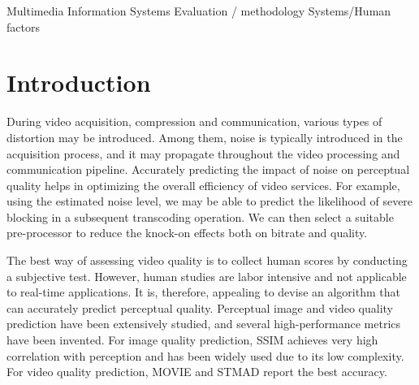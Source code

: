 \documentclass{sig-alternate}
\begin{document}
{Multimedia Information Systems Evaluation / methodology}
 {Systems/Human factors}


\section{Introduction}
During video acquisition, compression and communication, various types of distortion may be introduced. Among them, noise is typically introduced in the acquisition process, and it may propagate throughout the video processing and communication pipeline. Accurately predicting the impact of noise on perceptual quality helps in optimizing the overall efficiency of video services. For example, using the estimated noise level, we may be able to predict the likelihood of severe blocking in a subsequent transcoding operation\cite{AlMer1999}. We can then select a suitable pre-processor to reduce the knock-on effects both on bitrate and quality.

The best way of assessing video quality is to collect human scores by conducting a subjective test. However, human studies are labor intensive and not applicable to real-time applications. It is, therefore, appealing to devise an algorithm that can accurately predict perceptual quality. Perceptual image and video quality prediction have been extensively studied, and several high-performance metrics have been invented. For image quality prediction, SSIM\cite{SSIM} achieves very high correlation with perception and has been widely used due to its low complexity. For video quality prediction, MOVIE\cite{MOVIE} and STMAD\cite{STMAD} report the best accuracy. 
\end{document}

